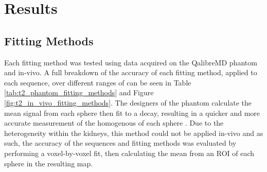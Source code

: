 \newpage

\section{Results}

\subsection{Fitting Methods}
\label{subsec:t2_fitting_methods_results}
Each fitting method was tested using data acquired on the QalibreMD phantom and in-vivo. A full breakdown of the accuracy of each fitting method, applied to each sequence, over different ranges of \ttwo can be seen in Table \ref{tab:t2_phantom_fitting_methods} and Figure \ref{fig:t2_in_vivo_fitting_methods}. The designers of the phantom calculate the mean signal from each sphere then fit to a \ttwo decay, resulting in a quicker and more accurate measurement of the homogenous \ttwo of each sphere \cite{mristandards_mristandardsphantomviewer_2020}. Due to the heterogeneity within the kidneys, this method could not be applied in-vivo and as such, the accuracy of the sequences and fitting methods was evaluated by performing a voxel-by-voxel fit, then calculating the mean \ttwo from an \ac{ROI} of each sphere in the resulting map.

